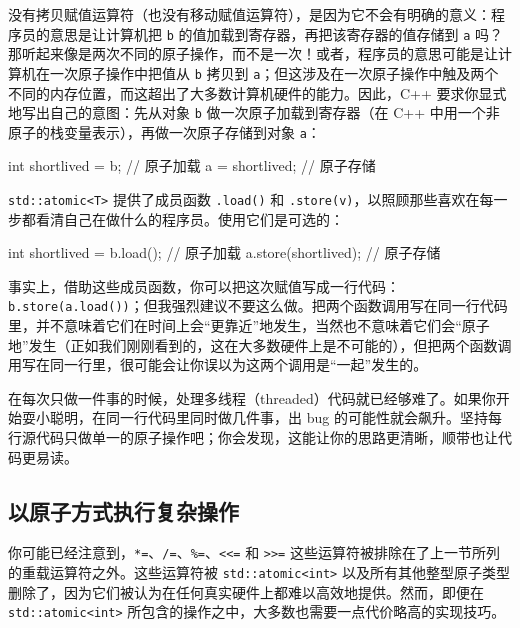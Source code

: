 没有拷贝赋值运算符（也没有移动赋值运算符），是因为它不会有明确的意义：程序员的意思是让计算机把 \texttt{b} 的值加载到寄存器，再把该寄存器的值存储到 \texttt{a} 吗？那听起来像是两次不同的原子操作，而不是一次！或者，程序员的意思可能是让计算机在一次原子操作中把值从 \texttt{b} 拷贝到 \texttt{a}；但这涉及在一次原子操作中触及两个不同的内存位置，而这超出了大多数计算机硬件的能力。因此，C++ 要求你显式地写出自己的意图：先从对象 \texttt{b} 做一次原子加载到寄存器（在 C++ 中用一个非原子的栈变量表示），再做一次原子存储到对象 \texttt{a}：

\begin{codebox}[cpp]
    int shortlived = b; // 原子加载
    a = shortlived; // 原子存储
\end{codebox}

\texttt{std::\allowbreak{}atomic<\allowbreak{}T>\allowbreak{}} 提供了成员函数 \texttt{.load(\allowbreak{})\allowbreak{}} 和 \texttt{.store(\allowbreak{}v)\allowbreak{}}，以照顾那些喜欢在每一步都看清自己在做什么的程序员。使用它们是可选的：

\begin{codebox}[cpp]
    int shortlived = b.load(); // 原子加载
    a.store(shortlived); // 原子存储
\end{codebox}

事实上，借助这些成员函数，你可以把这次赋值写成一行代码：\texttt{b.\allowbreak{}store(\allowbreak{}a.\allowbreak{}load(\allowbreak{})\allowbreak{})\allowbreak{}}；但我强烈建议不要这么做。把两个函数调用写在同一行代码里，并不意味着它们在时间上会“更靠近”地发生，当然也不意味着它们会“原子地”发生（正如我们刚刚看到的，这在大多数硬件上是不可能的），但把两个函数调用写在同一行里，很可能会让你误以为这两个调用是“一起”发生的。

在每次只做一件事的时候，处理多线程（threaded）代码就已经够难了。如果你开始耍小聪明，在同一行代码里同时做几件事，出 bug 的可能性就会飙升。坚持每行源代码只做单一的原子操作吧；你会发现，这能让你的思路更清晰，顺带也让代码更易读。

\subsection{以原子方式执行复杂操作}

你可能已经注意到，\texttt{*=}、\texttt{/\allowbreak{}=}、\texttt{\%=}、\texttt{<<=} 和 \texttt{>>=} 这些运算符被排除在了上一节所列的重载运算符之外。这些运算符被 \texttt{std::\allowbreak{}atomic<\allowbreak{}int>\allowbreak{}} 以及所有其他整型原子类型删除了，因为它们被认为在任何真实硬件上都难以高效地提供。然而，即便在 \texttt{std::\allowbreak{}atomic<\allowbreak{}int>\allowbreak{}} 所包含的操作之中，大多数也需要一点代价略高的实现技巧。

